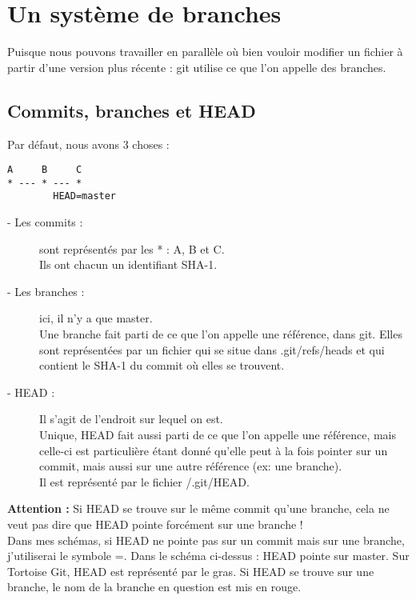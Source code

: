 \newpage
\section{Un système de branches}

Puisque nous pouvons travailler en parallèle où bien vouloir modifier un fichier à partir d'une version plus récente :
git utilise ce que l'on appelle des branches.\\

\subsection{Commits, branches et HEAD}

Par défaut, nous avons 3 choses :
\begin{verbatim}
A     B     C
* --- * --- *
        HEAD=master
\end{verbatim}

\begin{description}
\item[- Les commits : ] sont représentés par les * : A, B et C.\\
Ils ont chacun un identifiant SHA-1.\\
\item[- Les branches : ] ici, il n'y a que master.\\
Une branche fait parti de ce que l'on appelle une référence, dans git. Elles sont représentées par un fichier qui se situe dans .git/refs/heads et qui contient le SHA-1 du commit où elles se trouvent.\\
\item[- HEAD : ] Il s'agit de l'endroit sur lequel on est.\\
Unique, HEAD fait aussi parti de ce que l'on appelle une référence, mais celle-ci est particulière étant donné qu'elle peut à la fois pointer sur un commit, mais aussi sur une autre référence (ex: une branche).\\
Il est représenté par le fichier /.git/HEAD.\\
\end{description}

\textbf{Attention : }Si HEAD se trouve sur le même commit qu'une branche, cela ne veut pas dire que HEAD pointe forcément sur une branche !\\

Dans mes schémas, si HEAD ne pointe pas sur un commit mais sur une branche, j'utiliserai le symbole =. Dans le schéma ci-dessus : HEAD pointe sur master.
\newpage
Sur Tortoise Git, HEAD est représenté par le gras.
Si HEAD se trouve sur une branche, le nom de la branche en question est mis en rouge.\\

